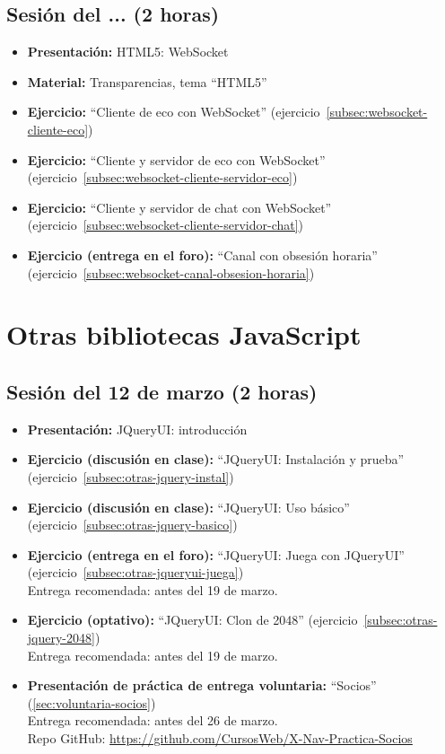 \documentclass[a4paper,12pt]{report}
\begin{document}
\subsection{Sesión del ... (2 horas)}

\begin{itemize}
 \item \textbf{Presentación:} HTML5: WebSocket
 \item \textbf{Material:} Transparencias, tema ``HTML5''
 \item \textbf{Ejercicio:} ``Cliente de eco con WebSocket'' (ejercicio~\ref{subsec:websocket-cliente-eco})
 \item \textbf{Ejercicio:} ``Cliente y servidor de eco con WebSocket'' (ejercicio~\ref{subsec:websocket-cliente-servidor-eco})
 \item \textbf{Ejercicio:} ``Cliente y servidor de chat con WebSocket'' (ejercicio~\ref{subsec:websocket-cliente-servidor-chat})
 \item \textbf{Ejercicio (entrega en el foro):} ``Canal con obsesión horaria'' (ejercicio~\ref{subsec:websocket-canal-obsesion-horaria})
\end{itemize}


\section{Otras bibliotecas JavaScript}

\subsection{Sesión del 12 de marzo (2 horas)}

\begin{itemize}
\item \textbf{Presentación:} JQueryUI: introducción
\item \textbf{Ejercicio (discusión en clase):} ``JQueryUI: Instalación y prueba'' (ejercicio~\ref{subsec:otras-jquery-instal})
\item \textbf{Ejercicio (discusión en clase):} ``JQueryUI: Uso básico'' (ejercicio~\ref{subsec:otras-jquery-basico}) \\
\item \textbf{Ejercicio (entrega en el foro):} ``JQueryUI: Juega con JQueryUI'' (ejercicio~\ref{subsec:otras-jqueryui-juega}) \\
  Entrega recomendada: antes del 19 de marzo.
\item \textbf{Ejercicio (optativo):} ``JQueryUI: Clon de 2048'' (ejercicio~\ref{subsec:otras-jquery-2048}) \\
  Entrega recomendada: antes del 19 de marzo.
\item \textbf{Presentación de práctica de entrega voluntaria:} ``Socios'' (\ref{sec:voluntaria-socios}) \\
  Entrega recomendada: antes del 26 de marzo. \\
  Repo GitHub: \url{https://github.com/CursosWeb/X-Nav-Practica-Socios}
\end{itemize}
\end{document}
